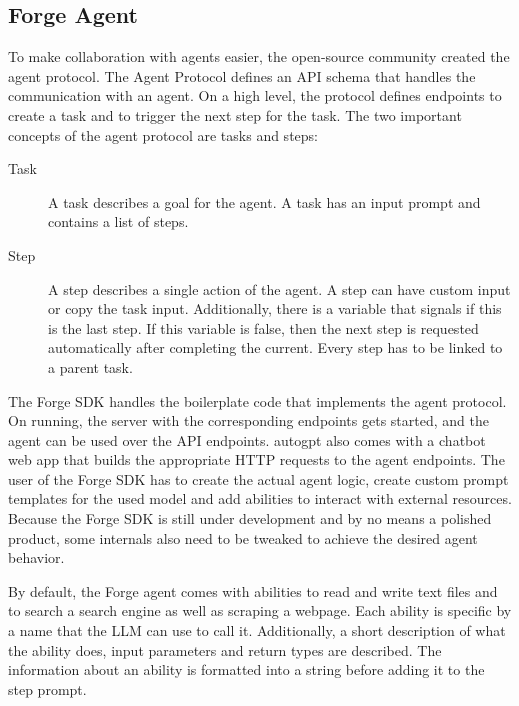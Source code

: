 \documentclass[../main.tex]{subfiles}
\begin{document}
\subsection{Forge Agent}
\label{subsec:forge_agent}

To make collaboration with agents easier, the open-source community created the agent protocol.
The Agent Protocol defines an API schema that handles the communication with an agent.
On a high level, the protocol defines endpoints to create a task and to trigger the next step for the task.
The two important concepts of the agent protocol are tasks and steps:

\begin{description}
      \item[Task] A task describes a goal for the agent.
            A task has an input prompt and contains a list of steps.
      \item[Step] A step describes a single action of the agent.
            A step can have custom input or copy the task input.
            Additionally, there is a variable that signals if this is the last step.
            If this variable is false, then the next step is requested automatically after completing the current.
            Every step has to be linked to a parent task.
\end{description}

The Forge SDK handles the boilerplate code that implements the agent protocol.
On running, the server with the corresponding endpoints gets started, and the agent can be used over the API endpoints.
\gls{autogpt} also comes with a chatbot web app that builds the appropriate HTTP requests to the agent endpoints.
The user of the Forge SDK has to create the actual agent logic, create custom prompt templates for the used model and add abilities to interact with external resources.
Because the Forge SDK is still under development and by no means a polished product, some internals also need to be tweaked to achieve the desired agent behavior.

By default, the Forge agent comes with abilities to read and write text files and to search a search engine as well as scraping a webpage.
Each ability is specific by a name that the LLM can use to call it.
Additionally, a short description of what the ability does, input parameters and return types are described.
The information about an ability is formatted into a string before adding it to the step prompt.
\end{document}
